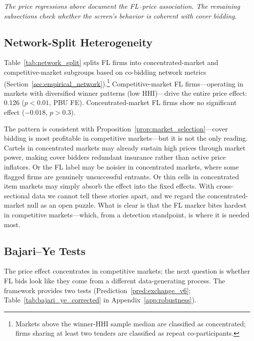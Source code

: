 


\medskip
\noindent\textit{The price regressions above document the FL--price
association. The remaining subsections check whether the screen's
behavior is coherent with cover bidding.}
\medskip

\subsection{Network-Split Heterogeneity}
\label{sec:results_network}

Table~\ref{tab:network_split} splits FL firms into
concentrated-market and competitive-market subgroups based on
co-bidding network metrics (Section~\ref{sec:empirical_network}).\footnote{Markets
above the winner-HHI sample median are classified as concentrated;
firms sharing at least two tenders are classified as repeat
co-participants.}
Competitive-market FL firms---operating in markets with diversified
winner patterns (low HHI)---drive the entire price effect: 0.126
($p < 0.01$, PBU FE). Concentrated-market FL firms show no significant
effect ($-0.018$, $p > 0.3$).

The pattern is consistent with Proposition~\ref{prop:market_selection}---cover bidding is most profitable in
competitive markets---but it is not the only reading. Cartels in
concentrated markets may already sustain high prices through market
power, making cover bidders redundant insurance rather than active
price inflators. Or the FL label may be noisier in concentrated
markets, where some flagged firms are genuinely unsuccessful entrants.
Or thin cells in concentrated item markets may simply absorb the
effect into the fixed effects. With cross-sectional data we cannot
tell these stories apart, and we regard the concentrated-market null as
an open puzzle. What is clear is that the FL marker bites hardest in
competitive markets---which, from a detection standpoint, is where it
is needed most.



\subsection{Bajari--Ye Tests}
\label{sec:results_bajari}

The price effect concentrates in competitive markets; the next
question is whether FL bids look like they come from a different
data-generating process. The \citet{bajari2003deciding} framework
provides two tests
(Prediction~\ref{pred:exchange_v6};
Table~\ref{tab:bajari_ye_corrected} in Appendix~\ref{app:robustness}).

